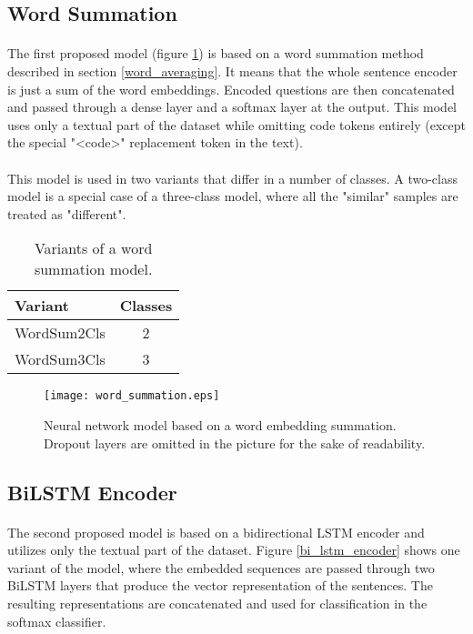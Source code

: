 \subsection{Word Summation}
\paragraph{}
The first proposed model (figure \ref{word_summation_model_figure}) is based on a word summation method described in section \ref{word_averaging}. It means that the whole sentence encoder is just a sum of the word embeddings. Encoded questions are then concatenated and passed through a dense layer and a softmax layer at the output. This model uses only a textual part of the dataset while omitting code tokens entirely  (except the special "<code>" replacement token in the text).

\paragraph{}
This model is used in two variants that differ in a number of classes. A two-class model is a special case of a three-class model, where all the "similar" samples are treated as "different".


\begin{table}[!h]
	\begin{center}
		\begin{tabular}{l c} 
			\hline
			\textbf{Variant} & \textbf{Classes} \\ [0.5ex] 
			\hline\hline
			WordSum2Cls & 2 \\ 
			WordSum3Cls & 3\\ 
			\hline
		\end{tabular}
	\end{center}
	\caption{Variants of a word summation model.}
	\label{word_summation_variants}
\end{table}

\begin{figure}[!h]
	\texttt{[image: word\_summation.eps]}
	\centering
	\caption{Neural network model based on a word embedding summation. Dropout layers are omitted in the picture for the sake of readability.}
	\label{word_summation_model_figure}
\end{figure}


\subsection{BiLSTM Encoder}
\paragraph{}
The second proposed model is based on a bidirectional LSTM encoder and utilizes only the textual part of the dataset. Figure \ref{bi_lstm_encoder} shows one variant of the model, where the embedded sequences are passed through two BiLSTM layers that produce the vector representation of the sentences. The resulting representations are concatenated and used for classification in the softmax classifier.

